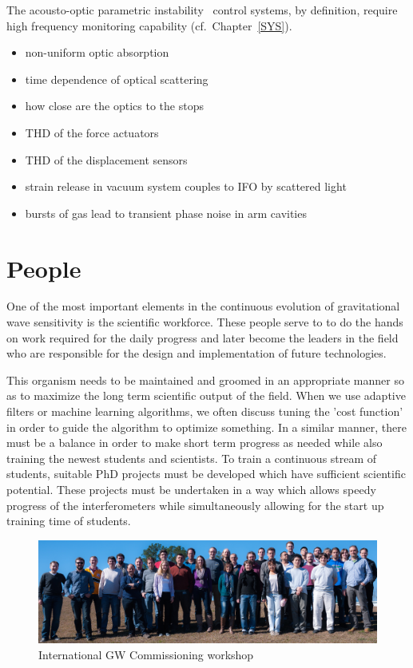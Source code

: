 The acousto-optic parametric instability~\cite{Matt:PI} control
    systems, by definition, require high frequency monitoring capability
    (cf.~Chapter~\ref{SYS}).

\begin{itemize}
  \item non-uniform optic absorption
  \item time dependence of optical scattering
  \item how close are the optics to the stops
  \item THD of the force actuators
  \item THD of the displacement sensors
  \item strain release in vacuum system couples to IFO by scattered light
  \item bursts of gas lead to transient phase noise in arm cavities
\end{itemize}

\section{People}
\label{s:People}
One of the most important elements in the continuous evolution of gravitational
wave sensitivity is the scientific workforce. These people serve to to do the
hands on work required for the daily progress and later become the leaders
in the field who are responsible for the design and implementation of future
technologies.

This organism needs to be maintained and groomed in an appropriate manner so
as to maximize the long term scientific output of the field. When we use
adaptive filters or machine learning algorithms, we often discuss tuning the
'cost function' in order to guide the algorithm to optimize something. In a
similar manner, there must be a balance in order to make short term progress
as needed while also training the newest students and scientists. To train
a continuous stream of students, suitable PhD projects must be developed
which have sufficient scientific potential. These projects must be
undertaken in a way which allows speedy progress of the interferometers
while simultaneously allowing for the start up training time of students.

\begin{figure}[h]
\centering
\includegraphics[width=\columnwidth]{Figures/GroupPhoto_LLOworkshop13.jpg}
\caption{International GW Commissioning workshop}
\label{fig:workshopPhotoLLO}
\end{figure}


